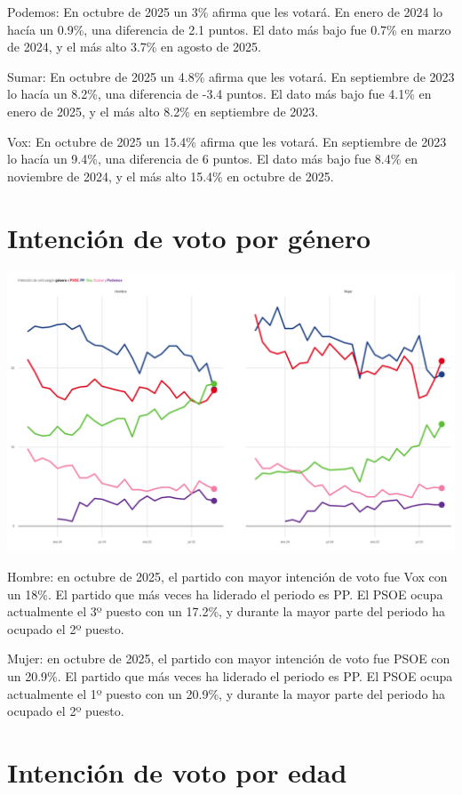 \documentclass[
  letterpaper,
  DIV=11,
  numbers=noendperiod]{scrreprt}
\begin{document}
{Podemos}: En octubre de 2025 un 3\% afirma que les votará. En enero de
2024 lo hacía un 0.9\%, una diferencia de 2.1 puntos. El dato más bajo
fue 0.7\% en marzo de 2024, y el más alto 3.7\% en agosto de 2025.

{Sumar}: En octubre de 2025 un 4.8\% afirma que les votará. En
septiembre de 2023 lo hacía un 8.2\%, una diferencia de -3.4 puntos. El
dato más bajo fue 4.1\% en enero de 2025, y el más alto 8.2\% en
septiembre de 2023.

{Vox}: En octubre de 2025 un 15.4\% afirma que les votará. En septiembre
de 2023 lo hacía un 9.4\%, una diferencia de 6 puntos. El dato más bajo
fue 8.4\% en noviembre de 2024, y el más alto 15.4\% en octubre de 2025.

\chapter{Intención de voto por
género}\label{intenciuxf3n-de-voto-por-guxe9nero}

\includegraphics[width=8in,height=\textheight,keepaspectratio]{figures/p_idv_genero_static.png}

Hombre: en octubre de 2025, el partido con mayor intención de voto fue
Vox con un 18\%. El partido que más veces ha liderado el periodo es PP.
El PSOE ocupa actualmente el 3º puesto con un 17.2\%, y durante la mayor
parte del periodo ha ocupado el 2º puesto.

Mujer: en octubre de 2025, el partido con mayor intención de voto fue
PSOE con un 20.9\%. El partido que más veces ha liderado el periodo es
PP. El PSOE ocupa actualmente el 1º puesto con un 20.9\%, y durante la
mayor parte del periodo ha ocupado el 2º puesto.

\chapter{Intención de voto por
edad}\label{intenciuxf3n-de-voto-por-edad}
\end{document}
